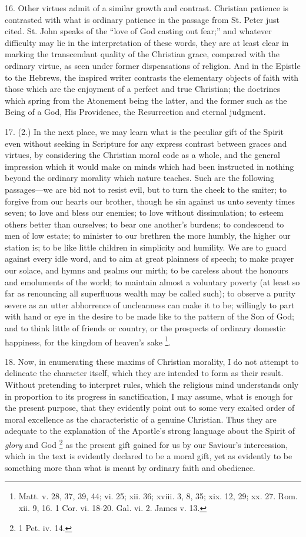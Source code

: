 16. Other virtues admit of a similar growth and contrast. Christian
patience is contrasted with what is ordinary patience in the passage
from St. Peter just cited. St. John speaks of the ``love of God
casting out fear;'' and whatever difficulty may lie in the
interpretation of these words, they are at least clear in marking the
transcendant quality of the Christian grace, compared with the
ordinary virtue, as seen under former dispensations of religion. And
in the Epistle to the Hebrews, the inspired writer contrasts the
elementary objects of faith with those which are the enjoyment of a
perfect and true Christian; the doctrines which spring from the
Atonement being the latter, and the former such as the Being of a God,
His Providence, the Resurrection and eternal judgment.

17. (2.) In the next place, we may learn what is the peculiar gift
of the Spirit even without seeking in Scripture for any express
contrast between graces and virtues, by considering the Christian
moral code as a whole, and the general impression which it would make
on minds which had been instructed in nothing beyond the ordinary
morality which nature teaches. Such are the following passages—we
are bid not to resist evil, but to turn the cheek to the smiter; to
forgive from our hearts our brother, though he sin against us unto
seventy times seven; to love and bless our enemies; to love without
dissimulation; to esteem others better than ourselves; to bear one
another's burdens; to condescend to men of low estate; to minister to
our brethren the more humbly, the higher our station is; to be like
little children in simplicity and humility. We are to guard against
every idle word, and to aim at great plainness of speech; to make
prayer our solace, and hymns and psalms our mirth; to be careless
about the honours and emoluments of the world; to maintain almost a
voluntary poverty (at least so far as renouncing all superfluous
wealth may be called such); to observe a purity severe as an utter
abhorrence of uncleanness can make it to be; willingly to part with
hand or eye in the desire to be made like to the pattern of the Son of
God; and to think little of friends or country, or the prospects of
ordinary domestic happiness, for the kingdom of heaven's sake \footnote{Matt. v. 28,
37, 39, 44; vi. 25; xii. 36; xviii. 3, 8, 35; xix. 12, 29; xx. 27.
Rom. xii. 9, 16. 1 Cor. vi. 18-20. Gal. vi. 2. James v. 13.}.

18. Now, in enumerating these maxims of Christian morality, I do
not attempt to delineate the character itself, which they are intended
to form as their result. Without pretending to interpret rules, which
the religious mind understands only in proportion to its progress in
sanctification, I may assume, what is enough for the present purpose,
that they evidently point out to some very exalted order of moral
excellence as the characteristic of a genuine Christian. Thus they are
adequate to the explanation of the Apostle's strong language about the
Spirit of \emph{glory} and God \footnote{1 Pet. iv. 14.}
as the present gift gained for us by our Saviour's intercession, which
in the text is evidently declared to be a moral gift, yet as evidently
to be something more than what is meant by ordinary faith and
obedience.

